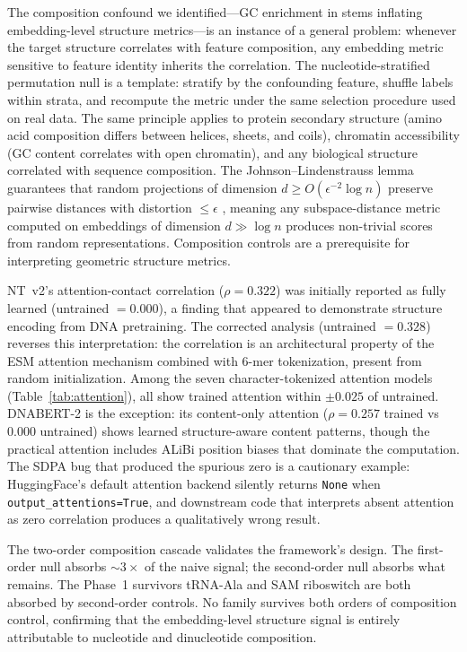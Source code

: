 \documentclass[11pt]{article}
\begin{document}
The composition confound we identified---GC enrichment in stems
inflating embedding-level structure metrics---is an instance of a
general problem: whenever the target structure correlates with feature
composition, any embedding metric sensitive to feature identity
inherits the correlation.  The nucleotide-stratified permutation null
is a template: stratify by the confounding feature, shuffle labels
within strata, and recompute the metric under the same selection
procedure used on real data.  The same principle applies to protein
secondary structure (amino acid composition differs between helices,
sheets, and coils), chromatin accessibility (GC content correlates
with open chromatin), and any biological structure correlated with
sequence composition.  The Johnson--Lindenstrauss lemma guarantees
that random projections of dimension $d \geq O(\epsilon^{-2} \log n)$
preserve pairwise distances with distortion $\leq \epsilon$
\citep{johnson1984extensions}, meaning any subspace-distance metric
computed on embeddings of dimension $d \gg \log n$ produces
non-trivial scores from random representations.  Composition controls
are a prerequisite for interpreting geometric structure metrics.

NT~v2's attention-contact correlation ($\rho = 0.322$) was initially
reported as fully learned (untrained $= 0.000$), a finding that
appeared to demonstrate structure encoding from DNA pretraining.  The
corrected analysis (untrained $= 0.328$) reverses this
interpretation: the correlation is an architectural property of the
ESM attention mechanism combined with 6-mer tokenization, present from
random initialization.  Among the seven character-tokenized attention
models (Table~\ref{tab:attention}), all show trained attention within
$\pm 0.025$ of untrained.  DNABERT-2 is the exception: its
content-only attention ($\rho = 0.257$ trained vs $0.000$ untrained)
shows learned structure-aware content patterns, though the practical
attention includes ALiBi position biases that dominate the
computation.  The SDPA bug that produced the spurious zero is a
cautionary example: HuggingFace's default attention backend silently
returns \texttt{None} when \texttt{output\_attentions=True}, and
downstream code that interprets absent attention as zero correlation
produces a qualitatively wrong result.

The two-order composition cascade validates the framework's design.
The first-order null absorbs ${\sim}3\times$ of the naive signal; the
second-order null absorbs what remains.  The Phase~1 survivors
tRNA-Ala and SAM riboswitch are both absorbed by second-order
controls.  No family survives both orders of composition control,
confirming that the embedding-level structure signal is entirely
attributable to nucleotide and dinucleotide composition.
\end{document}
